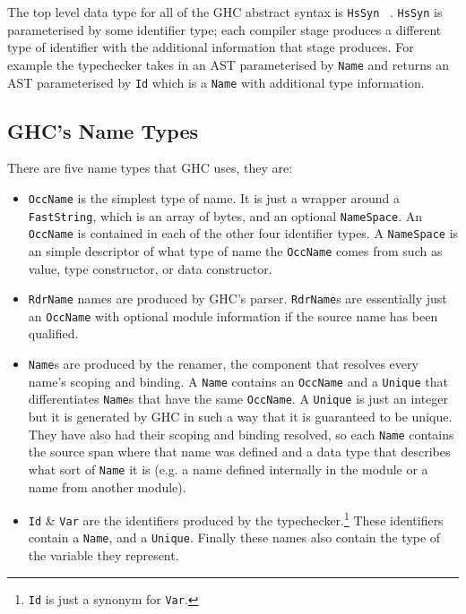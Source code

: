 The top level data type for all of the GHC abstract syntax is \texttt{HsSyn} ~\citep{ghcDesign}. \texttt{HsSyn} is parameterised by some identifier type; each compiler stage produces a different type of identifier with the additional information that stage produces. For example the typechecker takes in an AST parameterised by \texttt{Name} and returns an AST parameterised by \texttt{Id} which is a \texttt{Name} with additional type information.

\subsection{GHC's Name Types}\label{ghcNames}

There are five name types that GHC uses, they are:

\begin{itemize}
	\item \texttt{OccName} is the simplest type of name. It is just a wrapper around a \texttt{FastString}, which is an array of bytes, and an optional \texttt{NameSpace}. An \texttt{OccName} is contained in each of the other four identifier types. A \texttt{NameSpace} is an simple descriptor of what type of name the \texttt{OccName} comes from such as value, type constructor, or data constructor.
	\item \texttt{RdrName} names are produced by GHC's parser. \texttt{RdrName}s are essentially just an \texttt{OccName} with optional module information if the source name has been qualified. 
	\item \texttt{Name}s are produced by the renamer, the component that resolves every name's scoping and binding. A \texttt{Name} contains an \texttt{OccName} and a \texttt{Unique} that differentiates \texttt{Name}s that have the same \texttt{OccName}. A \texttt{Unique} is just an integer but it is generated by GHC in such a way that it is guaranteed to be unique. They have also had their scoping and binding resolved, so each \texttt{Name} contains the source span where that name was defined and a data type that describes what sort of \texttt{Name} it is (e.g. a name defined internally in the module or a name from another module).
	\item \texttt{Id} \& \texttt{Var} are the identifiers produced by the typechecker.\footnote{\texttt{Id} is just a synonym for \texttt{Var}.} These identifiers contain a \texttt{Name}, and a \texttt{Unique}. Finally these names also contain the type of the variable they represent. 
\end{itemize}

